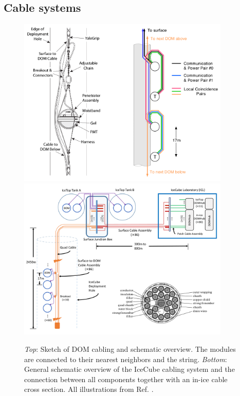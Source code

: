 \subsection{Cable systems}
\label{subsec:cablesystems}
\begin{figure}
\centering
\includegraphics[width=0.9\textwidth]{chapter5/img/cablelayout.png}
\includegraphics[width=0.9\textwidth]{chapter5/img/cableSchematic_withcable.png}
\caption{\textit{Top}: Sketch of DOM cabling and schematic overview. The modules are connected to their nearest neighbors and the string. \textit{Bottom}: General schematic overview of the IceCube cabling system and the connection between all components together with an in-ice cable cross section. All illustrations from Ref. \cite{Aartsen:2016nxy}.}
\label{fig:cable}
\end{figure}

